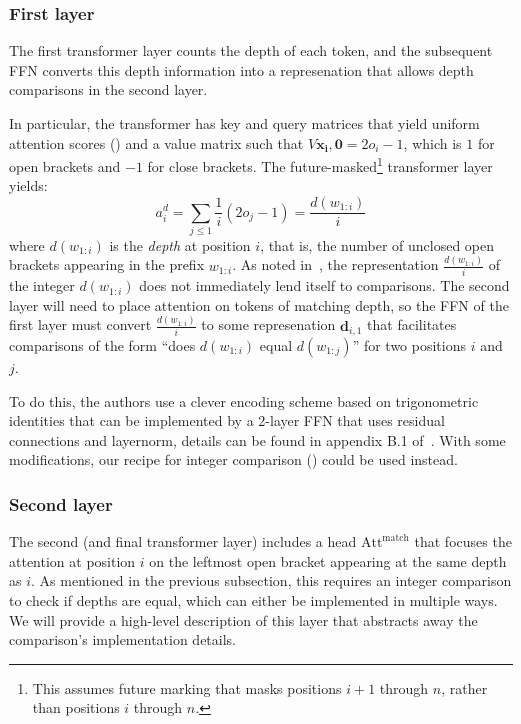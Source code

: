 \subsubsection{First layer}
The first transformer layer counts the depth of each token, and the subsequent FFN converts this depth information into a represenation that allows depth comparisons in the second layer.

In particular, the transformer has key and query matrices that yield uniform attention scores () and a value matrix such that $V\mathbf{x_i,0} = 2o_i-1$, which is $1$ for open brackets and $-1$ for close brackets. The future-masked\footnote{This assumes future marking that masks positions $i+1$ through $n$, rather than positions $i$ through $n$.} \AHAT{} transformer layer yields:\begin{equation*}
    a^d_i = \sum_{j\le 1} \frac{1}{i}(2o_j -1) = \frac{d(w_{1:i})}{i}
\end{equation*}
where $d(w_{1:i})$ is the \textit{depth} at position $i$, that is, the number of unclosed open brackets appearing in the prefix $w_{1:i}$. As noted in~, the representation $\frac{d(w_{1:i})}{i}$ of the integer $d(w_{1:i})$ does not immediately lend itself to comparisons. The second layer will need to place attention on tokens of matching depth, so the FFN of the first layer must convert $\frac{d(w_{1:i})}{i}$ to some represenation $\mathbf{d}_{i,1}$ that facilitates comparisons of the form ``does $d(w_{1:i})$ equal $d(w_{1:j})$'' for two positions $i$ and $j$.

To do this, the authors use a clever encoding scheme based on trigonometric identities that can be implemented by a 2-layer FFN that uses residual connections and layernorm, details can be found in appendix B.1 of~\citet{yao-2021-self-attention}. With some modifications, our recipe for integer comparison () could be used instead.

\subsubsection{Second layer}
The second (and final transformer layer) includes a head $\mathrm{Att}^{\mathrm{match}}$ that focuses the attention at position $i$ on the leftmost open bracket appearing at the same depth as $i$. As mentioned in the previous subsection, this requires an integer comparison to check if depths are equal, which can either be implemented in multiple ways. We will provide a high-level description of this layer that abstracts away the comparison's implementation details.

